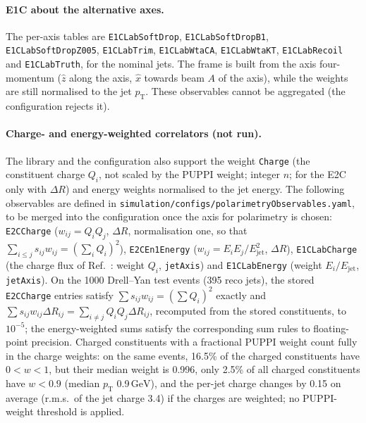 \documentclass[11pt]{article}
\newcommand{\pt}{p_{\mathrm{T}}}
\newcommand{\GeV}{\ensuremath{\,\mathrm{GeV}}}
\newcommand{\code}[1]{\texttt{#1}}
\begin{document}
\paragraph{E1C about the alternative axes.} The per-axis tables are \code{E1CLabSoftDrop}, \code{E1CLabSoftDropB1},
\code{E1CLabSoftDropZ005}, \code{E1CLabTrim}, \code{E1CLabWtaCA}, \code{E1CLabWtaKT}, \code{E1CLabRecoil} and
\code{E1CLabTruth}, for the nominal jets. The frame is built from the axis four-momentum ($\hat z$ along the axis,
$\hat x$ towards beam $A$ of the axis), while the weights are still normalised to the jet $\pt$. These observables
cannot be aggregated (the configuration rejects it).

\paragraph{Charge- and energy-weighted correlators (not run).} The library and the configuration also support the
weight \code{Charge} (the constituent charge $Q_i$, not scaled by the PUPPI weight; integer $n$; for the E2C only with
$\Delta R$) and energy weights normalised to the jet energy. The following observables are defined in
\code{simulation/configs/polarimetryObservables.yaml}, to be merged into the configuration once the axis for
polarimetry is chosen: \code{E2CCharge} ($w_{ij} = Q_iQ_j$, $\Delta R$, normalisation one, so that
$\sum_{i\le j} s_{ij}w_{ij} = (\sum_i Q_i)^2$), \code{E2CEn1Energy} ($w_{ij} = E_iE_j/E_\mathrm{jet}^2$, $\Delta R$),
\code{E1CLabCharge} (the charge flux of Ref.~\cite[App.~D]{Gao:2026bvp}: weight $Q_i$, \code{jetAxis}) and
\code{E1CLabEnergy} (weight $E_i/E_\mathrm{jet}$, \code{jetAxis}). On the 1000 Drell--Yan test events
(395 reco jets), the stored \code{E2CCharge} entries satisfy $\sum s_{ij}w_{ij} = (\sum Q_i)^2$ exactly and
$\sum s_{ij} w_{ij}\Delta R_{ij} = \sum_{i\ne j} Q_iQ_j\Delta R_{ij}$, recomputed from the stored constituents, to
$10^{-5}$; the energy-weighted sums satisfy the corresponding sum rules to floating-point precision. Charged
constituents with a fractional PUPPI weight count fully in the charge weights: on the same events, 16.5\% of the charged
constituents have $0 < w < 1$, but their median weight is 0.996, only 2.5\% of all charged constituents have $w < 0.9$
(median $\pt$ 0.9\GeV), and the per-jet charge changes by 0.15 on average (r.m.s.\ of the jet charge 3.4) if the
charges are weighted; no PUPPI-weight threshold is applied.
\end{document}
